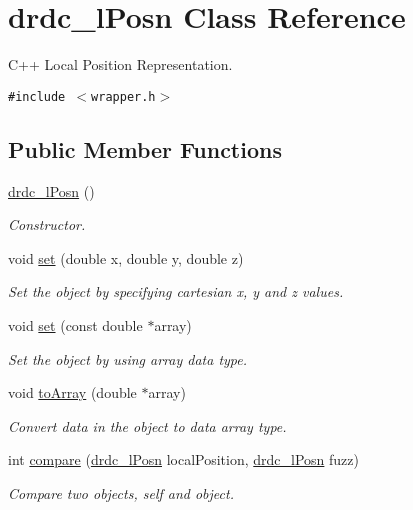 \hypertarget{classdrdc__lPosn}{
\section{drdc\_\-lPosn Class Reference}
\label{classdrdc__lPosn}
}
C++ Local Position Representation.  


{\tt \#include $<$wrapper.h$>$}

\subsection*{Public Member Functions}
\begin{CompactItemize}
\item 
\hyperlink{classdrdc__lPosn_39ab1367388ed6f655a1fec657e2fd20}{drdc\_\-lPosn} ()
\begin{CompactList}\small\item\em Constructor. \item\end{CompactList}\item 
void \hyperlink{classdrdc__lPosn_189bd909895a0c424d953ae266660a98}{set} (double x, double y, double z)
\begin{CompactList}\small\item\em Set the object by specifying cartesian x, y and z values. \item\end{CompactList}\item 
void \hyperlink{classdrdc__lPosn_d82b724217534dff477bebbfb35d9cc2}{set} (const double $\ast$array)
\begin{CompactList}\small\item\em Set the object by using array data type. \item\end{CompactList}\item 
void \hyperlink{classdrdc__lPosn_6479858b0308f15d6d08db65ac111cff}{toArray} (double $\ast$array)
\begin{CompactList}\small\item\em Convert data in the object to data array type. \item\end{CompactList}\item 
int \hyperlink{classdrdc__lPosn_f0a8ba3a6236839ec981029ad9c3d9f9}{compare} (\hyperlink{classdrdc__lPosn}{drdc\_\-lPosn} localPosition, \hyperlink{classdrdc__lPosn}{drdc\_\-lPosn} fuzz)
\begin{CompactList}\small\item\em Compare two objects, self and object. \item\end{CompactList}\item 

\end{CompactItemize}
